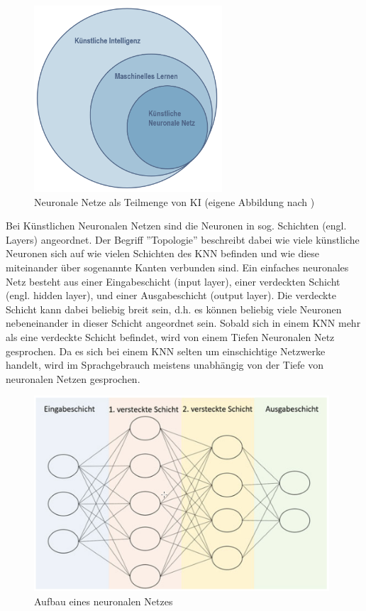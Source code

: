 \documentclass[a4paper,12pt, german]{report}
\begin{document}
\begin{figure}[H]
  \center
 \includegraphics[width=7cm]{images/EinordnungKNN.pptx.png}
  \caption[Neuronale Netze als Teilmenge von KI]{Neuronale Netze als Teilmenge von KI (eigene Abbildung nach \cite{17})}
\end{figure}

Bei Künstlichen Neuronalen Netzen sind die Neuronen in sog. Schichten (engl. Layers) angeordnet. Der Begriff ''Topologie'' beschreibt dabei wie viele künstliche Neuronen sich auf wie vielen Schichten des KNN befinden und wie diese miteinander über sogenannte Kanten verbunden sind. Ein einfaches neuronales Netz besteht aus einer Eingabeschicht (input layer), einer verdeckten Schicht (engl. hidden layer), und einer Ausgabeschicht (output layer). Die verdeckte Schicht kann dabei beliebig breit sein, d.h. es können beliebig viele Neuronen nebeneinander in dieser Schicht angeordnet sein. Sobald sich in einem KNN mehr als eine verdeckte Schicht befindet, wird von einem Tiefen Neuronalen Netz gesprochen. Da es sich bei einem KNN selten um einschichtige Netzwerke handelt, wird im Sprachgebrauch meistens unabhängig von der Tiefe von neuronalen Netzen gesprochen. \cite{17}

\begin{figure}[H]
  \center
 \includegraphics[width=11cm]{images/KNN-Schichten.png}
  \caption[Aufbau eines neuronalen Netzes]{Aufbau eines neuronalen Netzes \cite{17}}
\end{figure}
\end{document}
